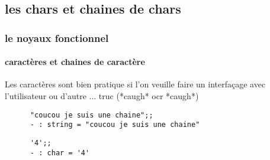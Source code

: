   \subsection{les chars et chaines de chars}
\begin{frame}[fragile]
    \frametitle{le noyaux fonctionnel}
    \framesubtitle{caractères et chaines de caractère}
    Les caractères sont bien pratique si l'on veuille faire un interfaçage avec l'utilisateur ou d'autre ... truc (*caugh* ocr *caugh*)\\
    \begin{minipage}[t]{10cm}
      \begin{lstlisting}
      "coucou je suis une chaine";;
      - : string = "coucou je suis une chaine"
      \end{lstlisting}
    \end{minipage}
    \begin{minipage}[t]{5cm}
      \begin{lstlisting}
      '4';;
      - : char = '4'
      \end{lstlisting}
    \end{minipage}
\end{frame}
